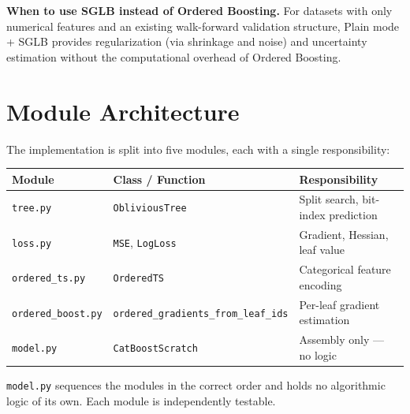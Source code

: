\documentclass[11pt, a4paper]{article}
\begin{document}
\textbf{When to use SGLB instead of Ordered Boosting.}
For datasets with only numerical features and an existing walk-forward
validation structure, Plain mode + SGLB provides regularization
(via shrinkage and noise) and uncertainty estimation without the
computational overhead of Ordered Boosting.

\section{Module Architecture}

The implementation is split into five modules, each with a single responsibility:

\begin{center}
\begin{tabular}{lll}
\toprule
\textbf{Module} & \textbf{Class / Function} & \textbf{Responsibility} \\
\midrule
\texttt{tree.py} & \texttt{ObliviousTree} & Split search, bit-index prediction \\
\texttt{loss.py} & \texttt{MSE}, \texttt{LogLoss} & Gradient, Hessian, leaf value \\
\texttt{ordered\_ts.py} & \texttt{OrderedTS} & Categorical feature encoding \\
\texttt{ordered\_boost.py} & \texttt{ordered\_gradients\_from\_leaf\_ids} & Per-leaf gradient estimation \\
\texttt{model.py} & \texttt{CatBoostScratch} & Assembly only --- no logic \\
\bottomrule
\end{tabular}
\end{center}

\texttt{model.py} sequences the modules in the correct order and holds
no algorithmic logic of its own. Each module is independently testable.
\end{document}
